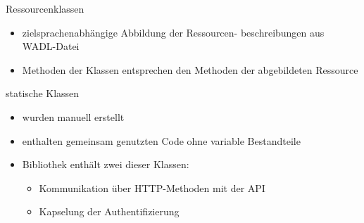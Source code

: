 \begin{frame}{Ressourcenklassen}
    \begin{itemize}
        \item zielsprachenabhängige Abbildung der Ressourcen-
beschreibungen aus WADL-Datei
        \item Methoden der Klassen entsprechen den Methoden der abgebildeten Ressource
    \end{itemize}
\end{frame}

\begin{frame}{statische Klassen}
    \begin{itemize}
        \item wurden manuell erstellt
        \item enthalten gemeinsam genutzten Code ohne variable Bestandteile
        \item Bibliothek enthält zwei dieser Klassen:
        \begin{itemize}
            \item Kommunikation über HTTP-Methoden mit der API
            \item Kapselung der Authentifizierung
        \end{itemize}
    \end{itemize}
\end{frame}